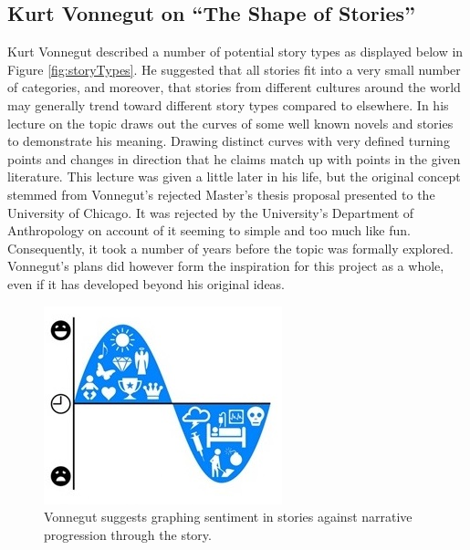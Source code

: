 \documentclass{article}
\begin{document}
{    \subsection{Kurt Vonnegut on ``The Shape of Stories''}
        Kurt Vonnegut described a number of potential story types as displayed below in Figure \ref{fig:storyTypes}. He suggested that all stories fit into a very small number of categories, and moreover, that stories from different cultures around the world may generally trend toward different story types compared to elsewhere. In his lecture on the topic \cite{vonnegutLecture} draws out the curves of some well known novels and stories to demonstrate his meaning. Drawing distinct curves with very defined turning points and changes in direction that he claims match up with points in the given literature. This lecture was given a little later in his life, but the original concept stemmed from Vonnegut's rejected Master's thesis proposal presented to the University of Chicago. It was rejected by the University's Department of Anthropology on account of it seeming to simple and too much like fun. Consequently, it took a number of years before the topic was formally explored. Vonnegut's plans did however form the inspiration for this project as a whole, even if it has developed beyond his original ideas.
        \begin{figure}[htbp]
            \centering
            \includegraphics{Figures/Misc/sentimentGraph}
            \caption{Vonnegut suggests graphing sentiment in stories against narrative progression through the story.}
            \label{fig:sentiGraph}
        \end{figure}
        \begin{figure}[htbp]
            \centering

\end{figure}}
\end{document}
